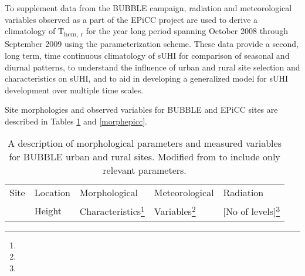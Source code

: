 \begin{bibunit}
To supplement data from the BUBBLE campaign, radiation and meteorological variables observed as a part of the EPiCC project are used to derive a climatology of T\textsubscript{hem, r} for the year long period spanning October 2008 through September 2009 using the parameterization scheme. These data provide a second, long term, time continuous climatology of sUHI for comparison of seasonal and diurnal patterns, to understand the influence of urban and rural site selection and characteristics on sUHI, and to aid in developing a generalized model for sUHI development over multiple time scales. 

Site morphologies and observed variables for BUBBLE and EPiCC sites are described in Tables \ref{morphbspr} and \ref{morphepicc}.

\begin{table}[H]
	\centering
	\caption{A description of morphological parameters and measured variables for BUBBLE urban and rural sites. Modified from \citet{Rotach2005} to include only relevant parameters.}
	\label{morphbspr}
	\begin{tabular*}{\textwidth}{p{3.75cm} p{2.25cm}p{3.5cm}p{2.75cm}p{2.75cm}}
		\toprule 
		Site & Location & Morphological & Meteorological & Radiation \\ 
		& Height & Characteristics\footnote{} & Variables\footnote{} & [No of levels]\footnote{} \\ 	\midrule
		

\end{tabular*}
\end{table}
\end{bibunit}
